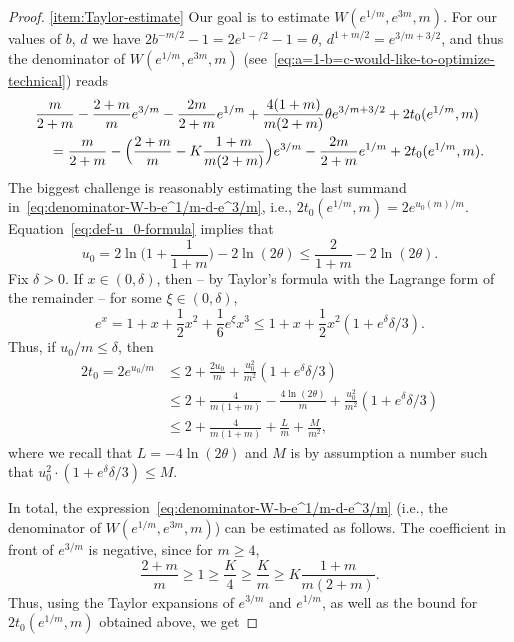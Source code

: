 \documentclass[a4paper]{amsart} %
\theoremstyle{definition}
\theoremstyle{remark}
\numberwithin{equation}{section}
\newcommand*{\XXXspecialbd}{W}
\begin{document}
\begin{proof}
	\ref{item:Taylor-estimate}  
	Our goal is to estimate $\XXXspecialbd(e^{1/m}, e^{3m}, m)$.
	For our values of $b$, $d$ 
	we have $2b^{-m/2} - 1 = 2e^{1-/2} - 1  =\theta$,
	$d^{1+m/2} = e^{3/m + 3/2}$,
	and thus the denominator of $\XXXspecialbd(e^{1/m}, e^{3m}, m)$ (see~\eqref{eq:a=1-b=c-would-like-to-optimize-technical})
	reads
	\begin{align}
	\label{eq:denominator-W-b-e^1/m-d-e^3/m}
	&\frac{m}{2+m} -\frac{2+m}{m} e^{3/m} - \frac{2m}{2+m} e^{1/m} %
	+ 	\frac{4(1+m)}{m(2+m)}\theta e^{3/m + 3/2} + 2t_0(e^{1/m},m)
	\\
	&\quad = \frac{m}{2+m} -\Bigl(\frac{2+m}{m} - K \frac{1+m}{m(2+m)}\Bigr)e^{3/m} - \frac{2m}{2+m} e^{1/m} 
	+ 2t_0(e^{1/m},m).\nonumber
	\end{align}
	The biggest challenge is reasonably estimating the last summand in~\eqref{eq:denominator-W-b-e^1/m-d-e^3/m}, i.e.,  $2 t_0(e^{1/m},m) = 2 e^{u_0(m)/m}$.
	Equation~\eqref{eq:def-u_0-formula} implies that
	\begin{equation*}
	u_0 %
	= 2 \ln\bigl(1+\frac{1}{1+m} \bigr) - 2\ln(2\theta)
	\leq \frac{2}{1+m} -2 \ln(2\theta).
	\end{equation*}
	Fix $\delta >0$.  
	If $x\in(0,\delta)$, then -- by Taylor's formula with the Lagrange form of the remainder -- for some $\xi\in (0,\delta)$,
	\[
	e^x = 1 + x + \frac{1}{2}x^2 + \frac{1}{6} e^{\xi} x^3 \leq 1 + x + \frac{1}{2}x^2 (1+ e^\delta \delta/3).
	\]
	Thus, if $u_0/m \leq \delta$,
	then
	\begin{align*}
	2t_0  =  2e^{u_0/m} &\leq 2 +  \frac{2u_0}{m} + \frac{u_0^2}{m^2}(1+ e^\delta \delta/3)\\
	&\leq 2 + \frac{4}{m(1+m)} - \frac{4\ln(2\theta)}{m} + \frac{u_0^2}{m^2}(1+ e^\delta \delta/3)\\
	&\leq  2 + \frac{4}{m(1+m)} + \frac{L}{m} + \frac{M}{m^2}, 
	\end{align*}
	where we recall that $L  = -4\ln(2\theta)$ and $M$ is by assumption a number such that
	$u_0^2 \cdot (1+ e^\delta \delta/3) \leq M$. 
	
	In total, the expression~\eqref{eq:denominator-W-b-e^1/m-d-e^3/m} (i.e., the denominator of $\XXXspecialbd(e^{1/m}, e^{3m}, m)$) can be estimated as follows.
	The coefficient in front of  $e^{3/m}$ is negative, since for $m\geq 4$,
	\[
	\frac{2+m}{m} \geq 1 \geq \frac{K}4 \geq \frac{K}m \geq K \frac{1+m}{m(2+m)}.
	\]
	Thus, using the Taylor expansions of $e^{3/m}$ and $e^{1/m}$,
	as well as the bound for $2t_0(e^{1/m},m)$ obtained above, we get
	

\end{proof}
\end{document}
